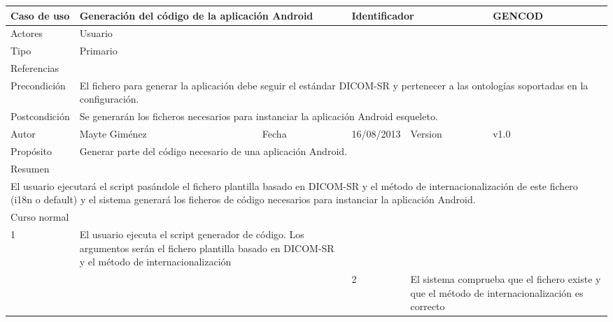 \begin{center}
  \begin{longtable}{ |b{2.5cm}|b{4cm}|b{1cm}|b{2cm}|b{1.5cm}| b{2.5cm}| }
    \hline
    \cellcolor{RubineRed} {\color{White} Caso de uso} & \multicolumn{2}{|l|}{\parbox{4.5cm}{Generación del código de la aplicación Android}}  & \multicolumn{2}{|l|}{\color{RubineRed} Identificador}  &  GENCOD \\ 
    \hline \hline
    {\color{RubineRed} Actores } & \multicolumn{5}{|l|}{Usuario}  \\ 
    \hline
    {\color{RubineRed} Tipo } & \multicolumn{5}{|l|}{Primario}  \\ 
    \hline
    {\color{RubineRed} Referencias } & \multicolumn{5}{|l|}{}  \\ 
    \hline
    {\color{RubineRed} Precondición } & \multicolumn{5}{|l|}{\parbox{13cm}{El fichero para generar la aplicación debe seguir el estándar DICOM-SR y pertenecer a las ontologías soportadas en la configuración.} }  \\ 
    \hline
    {\color{RubineRed} Postcondición } & \multicolumn{5}{|l|}{\parbox{13cm}{Se generarán los ficheros necesarios para instanciar la aplicación Android esqueleto.}}  \\ 
    \hline
    {\color{RubineRed} Autor } &  Mayte Giménez & {\color{RubineRed} Fecha } & 16/08/2013 & {\color{RubineRed} Version } & v1.0 \\ 
    \hline
    {\color{RubineRed} Propósito } & \multicolumn{5}{|l|}{\parbox{13cm}{ Generar parte del código necesario de una aplicación Android.}}  \\ 
    \hline
    \multicolumn{6}{|l|}{{\color{RubineRed} Resumen }}  \\ 
    \hline
   	\multicolumn{6}{|l|}{\parbox{16cm}{El usuario ejecutará el script pasándole el fichero plantilla basado en DICOM-SR y el método de internacionalización de este fichero (i18n o default) y el sistema generará los ficheros de código necesarios para instanciar la aplicación Android.}}  \\ 
    \hline
    \multicolumn{6}{|l|}{\parbox{8cm}{{\color{RubineRed} Curso normal }}}  \\ 
    \hline
   	1 & \multicolumn{2}{|l|}{\parbox{5cm}{ El usuario ejecuta el script generador de código. Los argumentos serán el fichero plantilla basado en DICOM-SR y el método de internacionalización}} &  & \multicolumn{2}{|l|}{}\\
    \hline
    & \multicolumn{2}{|l|}{} & 2 & \multicolumn{2}{|l|}{\parbox{5cm}{El sistema comprueba que el fichero existe y que el método de internacionalización es correcto}}\\

\end{longtable}
\end{center}
